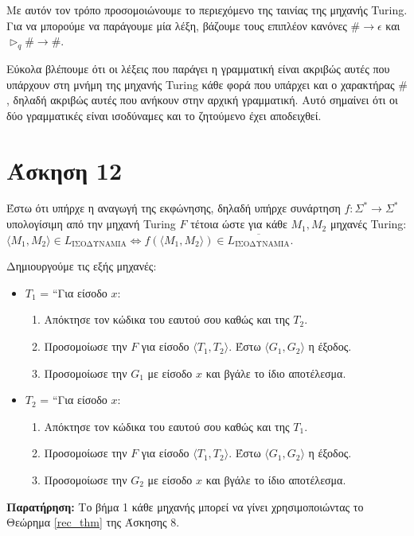 \documentclass[a4paper, oneside, 11pt]{article}
\theoremstyle{definition}
\begin{document}
Με αυτόν τον τρόπο προσομοιώνουμε το περιεχόμενο της ταινίας της μηχανής Turing. Για να μπορούμε να παράγουμε μία λέξη, βάζουμε τους επιπλέον κανόνες
$\#\rightarrow \epsilon$ και $\triangleright_q \#\rightarrow \#$.

Εύκολα βλέπουμε ότι οι λέξεις που παράγει η γραμματική είναι ακριβώς αυτές που υπάρχουν στη μνήμη της μηχανής Turing κάθε φορά που υπάρχει και ο
χαρακτήρας $\#$, δηλαδή ακριβώς αυτές που ανήκουν στην αρχική γραμματική. Αυτό σημαίνει ότι οι δύο γραμματικές είναι ισοδύναμες και το ζητούμενο έχει
αποδειχθεί.

\section*{Άσκηση 12}

Έστω ότι υπήρχε η αναγωγή της εκφώνησης, δηλαδή υπήρχε συνάρτηση $f : \Sigma^*
\rightarrow \Sigma^*$ υπολογίσιμη από την μηχανή Turing $F$ τέτοια ώστε για κάθε
$M_1, M_2$ μηχανές Turing: $\langle M_1, M_2 \rangle \in L_{\text{ΙΣΟΔΥΝΑΜΙΑ}}
\Leftrightarrow f(\langle M_1, M_2 \rangle) \in
\overline{L_{\text{ΙΣΟΔΥΝΑΜΙΑ}}}$.

Δημιουργούμε τις εξής μηχανές:

\begin{itemize}
\item $T_1$ = ``Για είσοδο $x$:
\begin{enumerate}
\item Απόκτησε τον κώδικα του εαυτού σου καθώς και της $T_2$.
\item Προσομοίωσε την $F$ για είσοδο $\langle T_1, T_2 \rangle$. Έστω $\langle
G_1, G_2 \rangle$ η έξοδος.
\item Προσομοίωσε την $G_1$ με είσοδο $x$ και βγάλε το ίδιο αποτέλεσμα.
\end{enumerate}
\item $T_2$ = ``Για είσοδο $x$:
\begin{enumerate}
\item Απόκτησε τον κώδικα του εαυτού σου καθώς και της $T_1$.
\item Προσομοίωσε την $F$ για είσοδο $\langle T_1, T_2 \rangle$. Έστω $\langle
G_1, G_2 \rangle$ η έξοδος.
\item Προσομοίωσε την $G_2$ με είσοδο $x$ και βγάλε το ίδιο αποτέλεσμα.
\end{enumerate}
\end{itemize}

\textbf{Παρατήρηση:} Το βήμα 1 κάθε μηχανής μπορεί να γίνει χρησιμοποιώντας το Θεώρημα \ref{rec_thm}
της Άσκησης 8.\\
\end{document}
